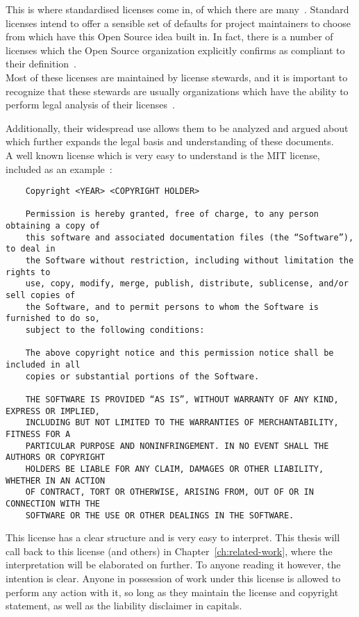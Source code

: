 This is where standardised licenses come in, of which there are many~\cite{spdx-licenses,opensource-org-licenses,github_innovation_graph_2025,osadl-license-checklists}. Standard licenses intend to offer a sensible set of defaults for project maintainers to choose from which have this Open Source idea built in. In fact, there is a number of licenses which the Open Source organization explicitly confirms as compliant to their definition~\cite{opensource-org-licenses}. \\

Most of these licenses are maintained by license stewards, and it is important to recognize that these stewards are usually organizations which have the ability to perform legal analysis of their licenses~\cite{opensource-org-licenses}.

Additionally, their widespread use allows them to be analyzed and argued about which further expands the legal basis and understanding of these documents. \\

A well known license which is very easy to understand is the MIT license, included as an example~\cite{opensource-org-mit}:
\begin{verbatim}
	Copyright <YEAR> <COPYRIGHT HOLDER>
	
	Permission is hereby granted, free of charge, to any person obtaining a copy of
	this software and associated documentation files (the “Software”), to deal in
	the Software without restriction, including without limitation the rights to
	use, copy, modify, merge, publish, distribute, sublicense, and/or sell copies of
	the Software, and to permit persons to whom the Software is furnished to do so,
	subject to the following conditions:
	
	The above copyright notice and this permission notice shall be included in all
	copies or substantial portions of the Software.
	
	THE SOFTWARE IS PROVIDED “AS IS”, WITHOUT WARRANTY OF ANY KIND, EXPRESS OR IMPLIED,
	INCLUDING BUT NOT LIMITED TO THE WARRANTIES OF MERCHANTABILITY, FITNESS FOR A
	PARTICULAR PURPOSE AND NONINFRINGEMENT. IN NO EVENT SHALL THE AUTHORS OR COPYRIGHT
	HOLDERS BE LIABLE FOR ANY CLAIM, DAMAGES OR OTHER LIABILITY, WHETHER IN AN ACTION
	OF CONTRACT, TORT OR OTHERWISE, ARISING FROM, OUT OF OR IN CONNECTION WITH THE
	SOFTWARE OR THE USE OR OTHER DEALINGS IN THE SOFTWARE.
\end{verbatim}

This license has a clear structure and is very easy to interpret. This thesis will call back to this license (and others) in Chapter~\ref{ch:related-work}, where the interpretation will be elaborated on further. To anyone reading it however, the intention is clear. Anyone in possession of work under this license is allowed to perform any action with it, so long as they maintain the license and copyright statement, as well as the liability disclaimer in capitals.


